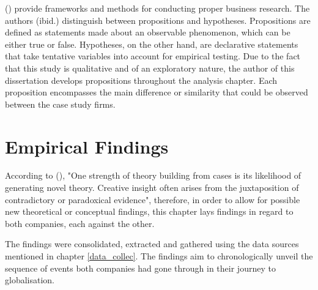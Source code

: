 \documentclass[11pt,a4paper]{article}
\begin{document}
{{\citeauthor{cooperBusinessResearchMethods2014} (\citeyear{cooperBusinessResearchMethods2014}) provide frameworks and methods for conducting proper business research. The authors (ibid.) distinguish between propositions and hypotheses. Propositions are defined as statements made about an observable phenomenon, which can be either true or false. Hypotheses, on the other hand, are declarative statements that take tentative variables into account for empirical testing. Due to the fact that this study is qualitative and of an exploratory nature, the author of this dissertation develops propositions throughout the analysis chapter. Each proposition encompasses the main difference or similarity that could be observed between the case study firms. 


\section{Empirical Findings}
\label{emp_findings}
According to \citeauthor{eisenhardtBuildingTheoriesCase1989} (\citeyear{eisenhardtBuildingTheoriesCase1989}), "One strength of theory building from cases is its likelihood of generating novel theory. Creative insight often arises from the juxtaposition of contradictory or paradoxical evidence", therefore, in order to allow for possible new theoretical or conceptual findings, this chapter lays findings in regard to both companies, each against the other. \par
The findings were consolidated, extracted and gathered using the data sources mentioned in chapter \ref{data_collec}. The findings aim to chronologically unveil the sequence of events both companies had gone through in their journey to globalisation. 

}}
\end{document}
